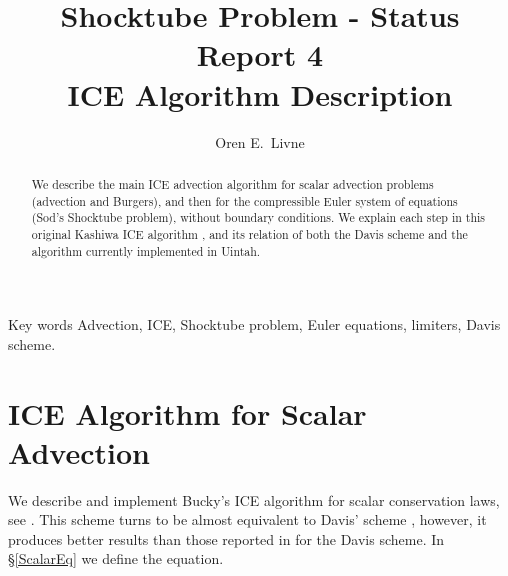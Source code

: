 \documentclass[11pt,oneside]{article}
\title{Shocktube Problem - Status Report 4 \\ ICE Algorithm Description}
\author{Oren E.~Livne \footnotemark[1]}
\makeatletter
\newcommand{\single }{\renewcommand{\baselinestretch}{1} \large \normalsize}
\newcommand{\double }{\renewcommand{\baselinestretch}{1.66} \large \normalsize}
\newcommand\keywordsname{Key words}
\newcommand\AMSname{AMS subject classifications}
\newenvironment{@abssec}[1]{%
     \if@twocolumn
       \section*{#1}%
     \else
       \vspace{.05in}\footnotesize
       \parindent .2in
         {\upshape\bfseries #1. }\ignorespaces
     \fi}
     {\if@twocolumn\else\par\vspace{.1in}\fi}
\newenvironment{keywords}{\begin{@abssec}{\keywordsname}}{\end{@abssec}}
\newenvironment{AMS}{\begin{@abssec}{\AMSname}}{\end{@abssec}}
\makeatother
\begin{document}
\def \myspace {\single}
\myspace

\maketitle

\renewcommand{\thefootnote}{\fnsymbol{footnote}}
\renewcommand{\thefootnote}{\arabic{footnote}}

\begin{abstract}
We describe the main ICE advection algorithm for scalar advection problems
(advection and Burgers), and then for the compressible Euler system of
equations (Sod's Shocktube problem), without boundary conditions. We explain
each step in this original Kashiwa ICE algorithm \cite{kashiwa2}, 
and its relation of both the Davis
scheme \cite{davis} and the algorithm currently implemented in Uintah.
\end{abstract}

\begin{keywords}
Advection, ICE, Shocktube problem, Euler equations, limiters, Davis scheme.
\end{keywords}


\pagestyle{myheadings}
\thispagestyle{plain}

\newpage
\tableofcontents


\newpage
\section{ICE Algorithm for Scalar Advection}
\label{BuckyScalar}

We describe and implement Bucky's ICE algorithm for scalar conservation laws,
see \cite[pp.~27--29]{kashiwa2}.
This scheme turns to be almost equivalent to Davis' scheme \cite{davis},
however, it produces better results than those reported in \cite{report_s3}
for the Davis scheme. In \S \ref{ScalarEq} we define the equation.
\end{document}
